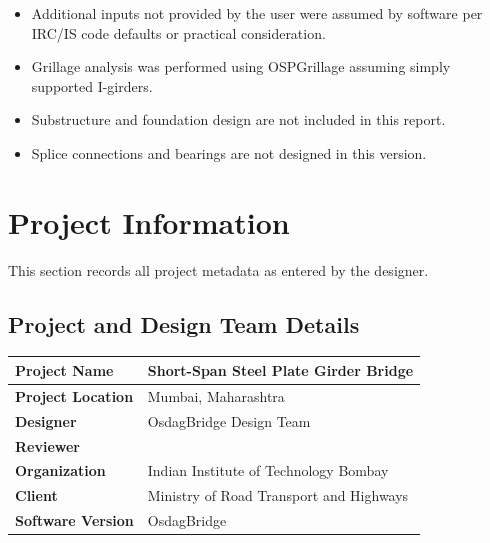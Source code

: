 \documentclass[12pt,a4paper]{report}
\numberwithin{table}{chapter}
\numberwithin{figure}{chapter}
\begin{document}
\begin{itemize}
\item Additional inputs not provided by the user were assumed by software per IRC/IS code defaults or practical consideration.
\item Grillage analysis was performed using OSPGrillage assuming simply supported I-girders.
\item Substructure and foundation design are not included in this report.
\item Splice connections and bearings are not designed in this version.
\end{itemize}

\titleformat{\chapter}[block]{\normalfont\Large\bfseries\centering}{\thechapter}{1em}{}
\titlespacing*{\chapter}{0pt}{-30pt}{10pt}


\chapter{Project Information}

This section records all project metadata as entered by the designer.

\section{Project and Design Team Details}
\label{sec:project-details}

\begin{tabular}{|L{5.5cm}|L{8.5cm}|}
\hline
\textbf{Project Name} & Short-Span Steel Plate Girder Bridge \\
\hline
\textbf{Project Location} & Mumbai, Maharashtra \\
\hline
\textbf{Designer} & OsdagBridge Design Team \\
\hline
\textbf{Reviewer} &  \\
\hline
\textbf{Organization} & Indian Institute of Technology Bombay \\
\hline
\textbf{Client} & Ministry of Road Transport and Highways \\
\hline
\textbf{Software Version} & OsdagBridge \\
\hline
\end{tabular}
\end{document}

